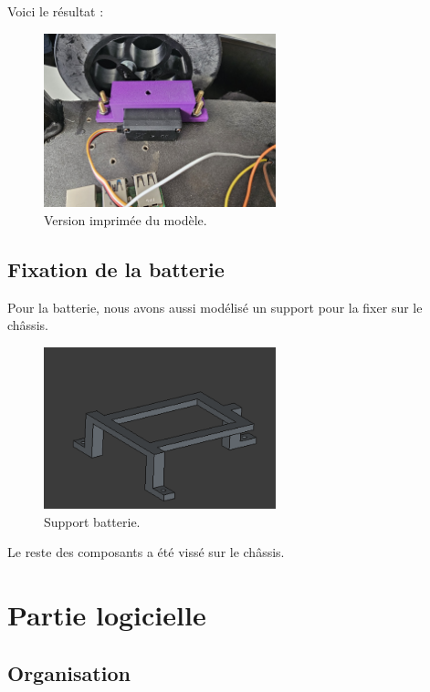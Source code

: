 \documentclass[a4paper,12pt]{report}  %
\begin{document}
Voici le résultat : 

\begin{figure}[H]
	\centering
	\includegraphics[width=0.6\textwidth]{./attachments/servomoteur-roues_impression.jpg}
	\caption{Version imprimée du modèle.}
\end{figure}

\subsection{Fixation de la batterie}
Pour la batterie, nous avons aussi modélisé un support pour la fixer sur le châssis.

\begin{figure}[H]
	\centering
	\includegraphics[width=0.6\textwidth]{./attachments/support_batterie_impression.png}
	\caption{Support batterie.}
\end{figure}

Le reste des composants a été vissé sur le châssis.

\section{Partie logicielle}
\subsection{Organisation}
\end{document}

